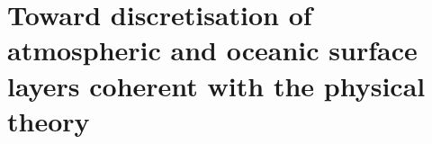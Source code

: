 \chapter{Toward discretisation of atmospheric and oceanic surface
layers coherent with the physical theory}
\label{ch:ND}
\minitoc




